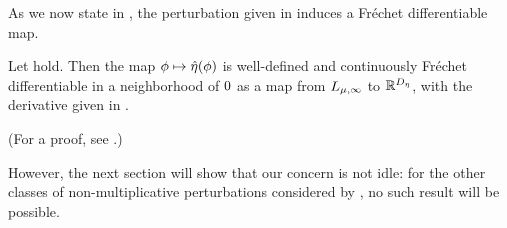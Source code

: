 As we now state in , the perturbation given in
 induces a Fr{\'e}chet differentiable map.

\begin{thm}
%
Let  hold. Then the map $\phi \mapsto
\hat\eta(\phi)$ is well-defined and continuously Fr{\'e}chet differentiable in a
neighborhood of $0$ as a map from ${L_{\mu,\infty}}$ to $\mathbb{R}^{D_{\eta}}$,
with the derivative given in .

(For a proof, see  .)

\end{thm}

However, the next section will show that our concern is not idle: for the other
classes of non-multiplicative perturbations considered by
\citet{gustafson:1996:local}, no such result will be possible.

